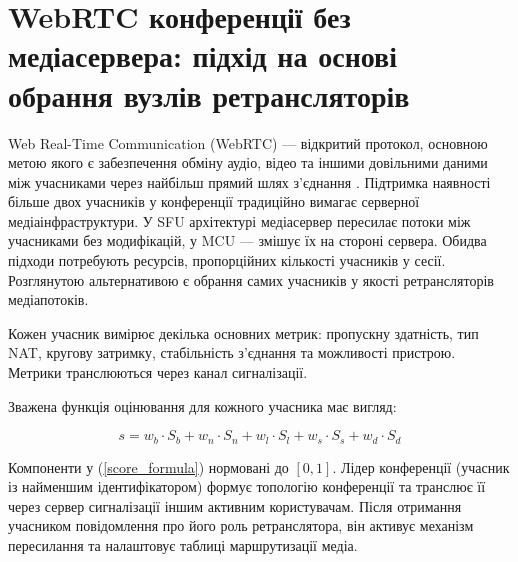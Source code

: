 \documentclass{SHVpaper}
\begin{document}

%

\section{WebRTC конференції без медіасервера: підхід на основі обрання вузлів ретрансляторів}



Web Real-Time Communication (WebRTC) --- відкритий протокол, основною метою якого є забезпечення обміну аудіо, відео та іншими довільними даними між учасниками через найбільш прямий шлях з’єднання \cite{rfc8825}. Підтримка наявності більше двох учасників у конференції традиційно вимагає серверної медіаінфраструктури. У SFU архітектурі медіасервер пересилає потоки між учасниками без модифікацій, у MCU --- змішує їх на стороні сервера. Обидва підходи потребують ресурсів, пропорційних кількості учасників у сесії. Розглянутою альтернативою є обрання самих учасників у якості ретрансляторів медіапотоків.

Кожен учасник вимірює декілька основних метрик: пропускну здатність, тип NAT, кругову затримку, стабільність з’єднання та можливості пристрою. Метрики транслюються через канал сигналізації.

Зважена функція оцінювання для кожного учасника має вигляд:

\begin{equation}
\label{score_formula}
s = w_b \cdot S_b + w_n \cdot S_n + w_l \cdot S_l + w_s \cdot S_s + w_d \cdot S_d
\end{equation}

Компоненти у (\ref{score_formula}) нормовані до $[0,1]$. Лідер конференції (учасник із найменшим ідентифікатором) формує топологію конференції та транслює її через сервер сигналізації іншим активним користувачам. Після отримання учасником повідомлення про його роль ретранслятора, він активує механізм пересилання та налаштовує таблиці маршрутизації медіа.
\end{document}
